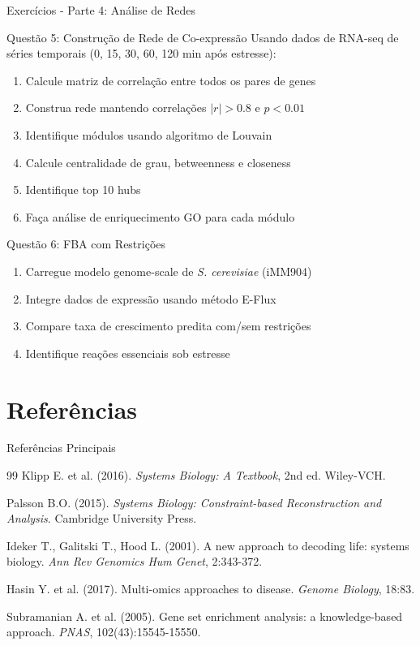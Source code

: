 \begin{frame}{Exercícios - Parte 4: Análise de Redes}
\begin{block}{Questão 5: Construção de Rede de Co-expressão}
Usando dados de RNA-seq de séries temporais (0, 15, 30, 60, 120 min após estresse):
\begin{enumerate}
    \item Calcule matriz de correlação entre todos os pares de genes
    \item Construa rede mantendo correlações $|r| > 0.8$ e $p < 0.01$
    \item Identifique módulos usando algoritmo de Louvain
    \item Calcule centralidade de grau, betweenness e closeness
    \item Identifique top 10 hubs
    \item Faça análise de enriquecimento GO para cada módulo
\end{enumerate}
\end{block}

\begin{block}{Questão 6: FBA com Restrições}
\begin{enumerate}
    \item Carregue modelo genome-scale de \textit{S. cerevisiae} (iMM904)
    \item Integre dados de expressão usando método E-Flux
    \item Compare taxa de crescimento predita com/sem restrições
    \item Identifique reações essenciais sob estresse
\end{enumerate}
\end{block}
\end{frame}

\section{Referências}

\begin{frame}{Referências Principais}
\begin{thebibliography}{99}
 Klipp E. et al. (2016). \textit{Systems Biology: A Textbook}, 2nd ed. Wiley-VCH.

 Palsson B.O. (2015). \textit{Systems Biology: Constraint-based Reconstruction and Analysis}. Cambridge University Press.

 Ideker T., Galitski T., Hood L. (2001). A new approach to decoding life: systems biology. \textit{Ann Rev Genomics Hum Genet}, 2:343-372.

 Hasin Y. et al. (2017). Multi-omics approaches to disease. \textit{Genome Biology}, 18:83.

 Subramanian A. et al. (2005). Gene set enrichment analysis: a knowledge-based approach. \textit{PNAS}, 102(43):15545-15550.
\end{thebibliography}
\end{frame}

